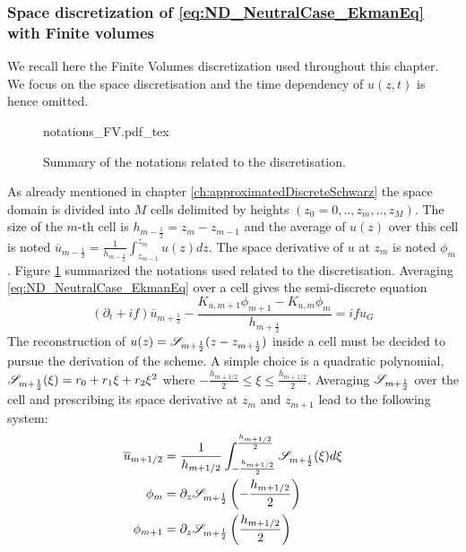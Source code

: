 \subsubsection{Space discretization of
\eqref{eq:ND_NeutralCase_EkmanEq} with Finite volumes}
\label{sec:ND_NeutralCase_recallSplines}
We recall here the Finite Volumes discretization used throughout
this chapter. We focus on the space discretisation and the time
dependency of $u(z, t)$ is hence omitted.
\begin{figure}
	\centering
	{notations_FV.pdf_tex}
	\caption{Summary of the notations related to the discretisation.}
	\label{fig:ND_NeutralCase_summary_notations}
\end{figure}
\par
As already mentioned in chapter \ref{ch:approximatedDiscreteSchwarz}
the space domain is divided into $M$ cells delimited by
heights $(z_0=0, .., z_m, .., z_M)$. The size of the $m$-th cell
is $h_{m-\frac{1}{2}}=z_{m}-z_{m-1}$ and the average of $u(z)$
over this cell is noted
$\overline{u}_{m-\frac{1}{2}}=\frac{1} {h_{m-\frac{1}{2}}}
\int_{z_{m-1}}^{z_m}u(z)dz$.
The space derivative of $u$ at $z_m$ is noted $\phi_{m}$.
Figure \ref{fig:ND_NeutralCase_summary_notations} summarized
the notations used related to the discretisation.
Averaging \eqref{eq:ND_NeutralCase_EkmanEq} over a cell gives
the semi-discrete equation
\begin{equation}
\label{eq:ND_NeutralCase_semiDiscreteEkmanEq}
	(\partial_t + if) \overline{u}_{m+\frac{1}{2}} - 
	\frac{K_{u, m+1} \phi_{m+1} - K_{u, m} \phi_{m}}
		{h_{m+\frac{1}{2}}} = i f u_G
\end{equation}
The reconstruction of $u(z) = {\cal S}_{m+\frac{1}{2}}
				(z - z_{m+\frac{1}{2}})$
				inside a cell must be decided
to pursue the derivation of the scheme. A simple choice is
a quadratic polynomial,
${\cal S}_{m+\frac{1}{2}}(\xi) = r_0 + r_1 \xi + r_2 \xi^2$ where
$-\frac{h_{m+1/2}}{2} \leq \xi \leq \frac{h_{m+1/2}}{2}$.
Averaging ${\cal S}_{m+\frac{1}{2}}$ over the cell and
prescribing its space derivative at $z_{m}$ and $z_{m+1}$
lead to the following system:
\begin{equation}
	\begin{aligned}
		\overline{u}_{m+1/2} &= \frac{1}{h_{m+1/2}}
		\int_{-\frac{h_{m+1/2}}{2}}^{\frac{h_{m+1/2}}{2}}
		{\cal S}_{m+\frac{1}{2}}(\xi)d\xi\\
		\phi_m &= \partial_z {\cal S}_{m+\frac{1}{2}}
		\left(-\frac{h_{m+1/2}}{2}\right)\\
		\phi_{m+1} &=
		\partial_z {\cal S}_{m+\frac{1}{2}}
		\left(\frac{h_{m+1/2}}{2}\right)
	\end{aligned}
\end{equation}
